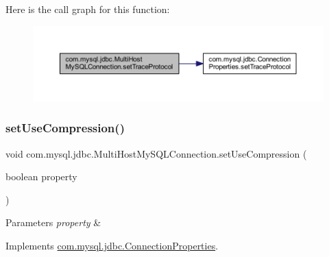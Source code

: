 Here is the call graph for this function\+:
\nopagebreak
\begin{figure}[H]
\begin{center}
\leavevmode
\includegraphics[width=350pt]{classcom_1_1mysql_1_1jdbc_1_1_multi_host_my_s_q_l_connection_aa661c53930b9d9af7528cf6cf24a2fce_cgraph}
\end{center}
\end{figure}
\mbox{\label{classcom_1_1mysql_1_1jdbc_1_1_multi_host_my_s_q_l_connection_ac6291b99cbc9ae36778e00c3c95603b2}} 
\subsubsection{\texorpdfstring{set\+Use\+Compression()}{setUseCompression()}}
{\footnotesize\ttfamily void com.\+mysql.\+jdbc.\+Multi\+Host\+My\+S\+Q\+L\+Connection.\+set\+Use\+Compression (\begin{DoxyParamCaption}\item[{boolean}]{property }\end{DoxyParamCaption})}


\begin{DoxyParams}{Parameters}
{\em property} & \\
\hline
\end{DoxyParams}


Implements \mbox{\hyperlink{interfacecom_1_1mysql_1_1jdbc_1_1_connection_properties_a60f864890c4947c6a45fb0d99cc7c78d}{com.\+mysql.\+jdbc.\+Connection\+Properties}}.

